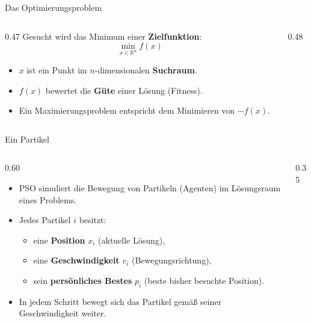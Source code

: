 \begin{frame}{Das Optimierungsproblem}
\begin{columns}
\begin{column}{0.47\textwidth}
Gesucht wird das Minimum einer \textbf{Zielfunktion}:
\[
\min_{x \in \mathbb{R}^n} f(x)
\]
\begin{itemize}
\item $x$ ist ein Punkt im $n$-dimensionalen \textbf{Suchraum}.
\item $f(x)$ bewertet die \textbf{Güte} einer Lösung (Fitness).
\item Ein Maximierungsproblem entspricht dem Minimieren von $-f(x)$.
\end{itemize}
\end{column}
\begin{column}{0.48\textwidth}
\centering

\end{column}
\end{columns}
\end{frame}

\begin{frame}{Ein Partikel}
\begin{columns}
\begin{column}{0.60\textwidth}
  \begin{itemize}
\item PSO simuliert die Bewegung von Partikeln (Agenten) im Lösungsraum eines Problems.
\item Jedes Partikel $i$ besitzt:
\begin{itemize}
\item eine \textbf{Position} $x_i$ (aktuelle Lösung),
\item eine \textbf{Geschwindigkeit} $v_i$ (Bewegungsrichtung),
\item sein \textbf{persönliches Bestes} $p_i$ (beste bisher besuchte Position).
\end{itemize}
\item In jedem Schritt bewegt sich das Partikel gemäß seiner Geschwindigkeit weiter.
\end{itemize}
\end{column}
\begin{column}{0.35\textwidth}
\centering
{}
\end{column}
\end{columns}
\end{frame}

